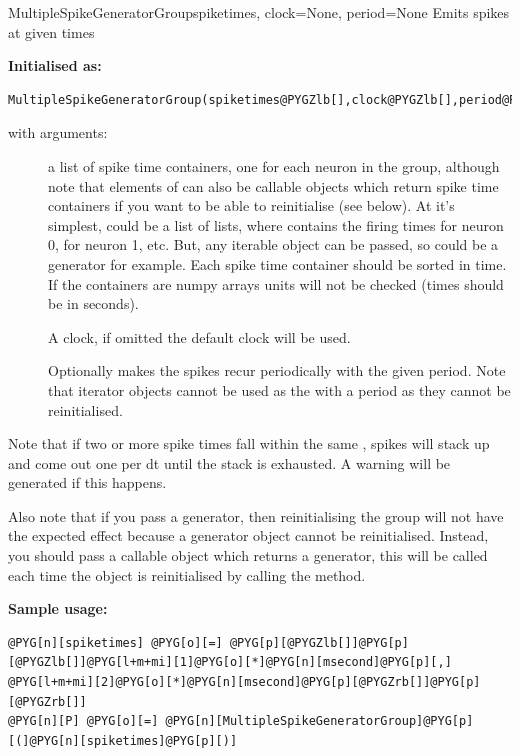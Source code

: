 \documentclass[letterpaper,10pt,english]{manual}
\begin{document}
\hypertarget{brian.MultipleSpikeGeneratorGroup}{}\begin{classdesc}{MultipleSpikeGeneratorGroup}{spiketimes, clock=None, period=None}
Emits spikes at given times

\textbf{Initialised as:}

\begin{Verbatim}[commandchars=@\[\]]
MultipleSpikeGeneratorGroup(spiketimes@PYGZlb[],clock@PYGZlb[],period@PYGZrb[]@PYGZrb[])
\end{Verbatim}

with arguments:
\begin{description}
\item[] \leavevmode
a list of spike time containers, one for each neuron in the group,
although note that elements of  can also be callable objects which
return spike time containers if you want to be able to reinitialise (see below).
At it's simplest,  could be a list of lists, where  contains
the firing times for neuron 0,  for neuron 1, etc. But, any iterable
object can be passed, so  could be a generator for example. Each
spike time container should be sorted in time. If the containers are numpy arrays units
will not be checked (times should be in seconds).

\item[] \leavevmode
A clock, if omitted the default clock will be used.

\item[] \leavevmode
Optionally makes the spikes recur periodically with the given
period. Note that iterator objects cannot be used as the 
with a period as they cannot be reinitialised.

\end{description}

Note that if two or more spike times fall within the same , spikes will stack up
and come out one per dt until the stack is exhausted. A warning will be generated
if this happens.

Also note that if you pass a generator, then reinitialising the group will not have the
expected effect because a generator object cannot be reinitialised. Instead, you should
pass a callable object which returns a generator, this will be called each time the
object is reinitialised by calling the  method.

\textbf{Sample usage:}

\begin{Verbatim}[commandchars=@\[\]]
@PYG[n][spiketimes] @PYG[o][=] @PYG[p][@PYGZlb[]]@PYG[p][@PYGZlb[]]@PYG[l+m+mi][1]@PYG[o][*]@PYG[n][msecond]@PYG[p][,] @PYG[l+m+mi][2]@PYG[o][*]@PYG[n][msecond]@PYG[p][@PYGZrb[]]@PYG[p][@PYGZrb[]]
@PYG[n][P] @PYG[o][=] @PYG[n][MultipleSpikeGeneratorGroup]@PYG[p][(]@PYG[n][spiketimes]@PYG[p][)]
\end{Verbatim}
\end{classdesc}
\end{document}
